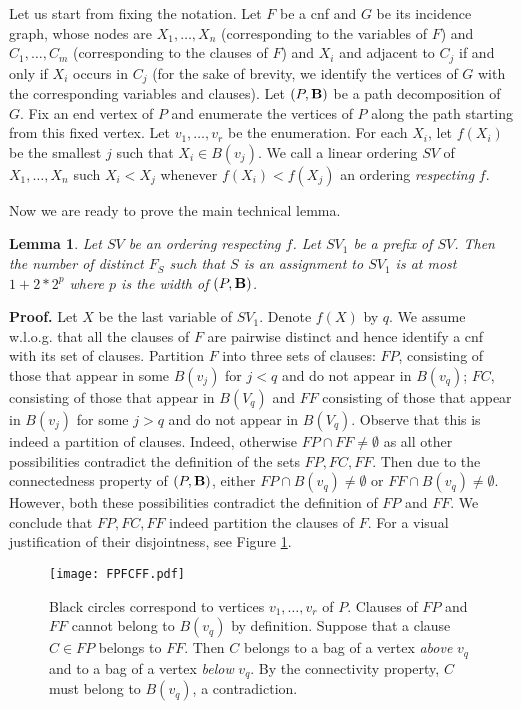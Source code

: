 \documentclass{article}
\newtheorem{lemma}{Lemma}
\begin{document}
Let us start from fixing the notation. 
Let $F$ be a {\sc cnf} and $G$ be its incidence graph, 
whose nodes are $X_1, \dots, X_n$ (corresponding to the variables of $F$)
and $C_1, \dots, C_m$ (corresponding to the clauses of $F$) and $X_i$ and adjacent
to $C_j$ if and only if $X_i$ occurs in $C_j$ (for the sake of brevity, we identify 
the vertices of $G$ with the corresponding variables and clauses). 
Let $(P,{\bf B})$ be a path decomposition of $G$.  Fix an end
vertex of $P$ and enumerate the vertices of $P$ along the path starting from
this fixed vertex. Let $v_1, \dots, v_r$ be the enumeration.
For each $X_i$, let $f(X_i)$ be the smallest $j$ such that $X_i \in B(v_j)$.
We call a linear ordering $SV$ of $X_1, \dots, X_n$ such $X_i<X_j$ whenever
$f(X_i)<f(X_j)$ an ordering \emph{respecting} $f$. 

Now we are ready to prove the main technical lemma.

\begin{lemma} \label{layersize}
Let $SV$ be an ordering respecting $f$.
Let $SV_1$ be a prefix of $SV$. Then the number of distinct
$F_S$ such that $S$ is an assignment to $SV_1$ is at most
$1+2*2^p$ where $p$ is the width of $(P,{\bf B})$.
\end{lemma} 

{\bf Proof.} 
Let $X$ be the last variable of $SV_1$. Denote $f(X)$ by $q$. 
We assume w.l.o.g. that all the clauses of $F$ are pairwise distinct
and hence identify a {\sc cnf} with its set of clauses. 
Partition $F$ into three sets of clauses: $FP$, consisting of those that 
appear in some $B(v_j)$ for $j<q$ and do not appear in $B(v_q)$; $FC$, 
consisting of those that appear in $B(V_q)$ and $FF$ consisting of those
that appear in $B(v_j)$ for some $j>q$ and do not appear in $B(V_q)$.
Observe that this is indeed a partition of clauses.
Indeed, otherwise $FP \cap FF \neq \emptyset$ as all other possibilities
contradict the definition of the sets $FP,FC,FF$. 
Then due to the connectedness property of $(P,{\bf B})$,
either $FP \cap B(v_q) \neq \emptyset$ or $FF \cap B(v_q) \neq \emptyset$.
However, both these possibilities contradict the definition of $FP$ and $FF$.
We conclude that $FP,FC,FF$ indeed partition the clauses of $F$. For a visual 
justification of their disjointness, see Figure \ref{FPFCFFPic}.

\begin{figure}[h] 
\centering
\texttt{[image: FPFCFF.pdf]}
\caption{Black circles correspond to vertices $v_1, \dots, v_r$ of $P$. Clauses of $FP$
and $FF$ cannot belong to $B(v_q)$ by definition. Suppose that a clause $C \in FP$ belongs 
to $FF$. Then $C$ belongs to a bag of a vertex \emph{above} $v_q$ and to a bag of a vertex \emph{below} $v_q$.
By the connectivity property, $C$ must belong to $B(v_q)$, a contradiction.}
\label{FPFCFFPic}
\end{figure}
\end{document}
